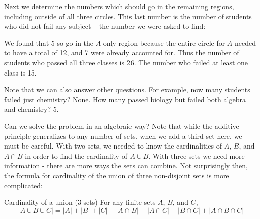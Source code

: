 \documentclass[12pt]{article}
\begin{document}
\begin{example}
\begin{solution}
\begin{center}
\end{center}

Next we determine the numbers which should go in the remaining regions, including outside of all three circles.  This last number is the number of students who did not fail any subject -- the number we were asked to find:

\begin{center}
\end{center}

We found that 5 so go in the $A$ only region because the entire circle for $A$ needed to have a total of 12, and 7 were already accounted for.  Thus the number of students who passed all three classes is 26.  The number who failed at least one class is 15.

Note that we can also answer other questions.  For example, now many students failed just chemistry?  None.  How many passed biology but failed both algebra and chemistry? 5.

 \end{solution}
\end{example} 
 
Can we solve the problem in an algebraic way?  Note that while the additive principle generalizes to any number of sets, when we add a third set here, we must be careful. With two sets, we needed to know the cardinalities of $A$, $B$, and $A \cap B$ in order to find the cardinality of $A \cup B$.  With three sets we need more information - there are more ways the sets can combine.  Not surprisingly then, the formula for cardinality of the union of three non-disjoint sets is more complicated:


\begin{defbox}{Cardinality of a union (3 sets)}
  For any finite sets $A$, $B$, and $C$,
  \[|A \cup B \cup C| = |A| + |B| + |C| - |A \cap B| - |A \cap C| - |B \cap C| + |A \cap B \cap C|\]
\end{defbox}
\end{document}
